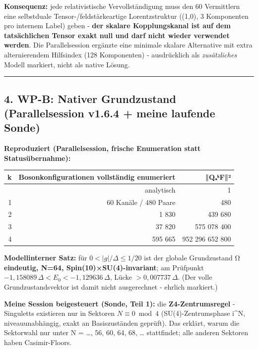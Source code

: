 \textbf{Konsequenz:} jede relativistische Vervollständigung muss den 60
Vermittlern eine selbstduale Tensor-/feldstärkeartige Lorentzstruktur
((1,0), 3 Komponenten pro internem Label) geben - \textbf{der skalare
Kopplungskanal ist auf dem tatsächlichen Tensor exakt null und darf
nicht wieder verwendet werden}. Die Parallelsession ergänzte eine
minimale skalare Alternative mit extra alternierendem Hilfsindex (128
Komponenten) - ausdrücklich als \emph{zusätzliches} Modell markiert,
nicht als native Lösung.

\begin{center}\rule{0.5\linewidth}{0.5pt}\end{center}

\subsection{4. WP-B: Nativer Grundzustand (Parallelsession v1.6.4 +
meine laufende
Sonde)}\label{wp-b-nativer-grundzustand-parallelsession-v1.6.4-meine-laufende-sonde}

\textbf{Reproduziert (Parallelsession, frische Enumeration statt
Statusübernahme):}

{\def\LTcaptype{none} %
\begin{longtable}[]{@{}rrr@{}}
\toprule\noalign{}
k & Bosonkonfigurationen vollständig enumeriert & ‖Q₊ᵏF‖² \\
\midrule\noalign{}
\endhead
\bottomrule\noalign{}
\endlastfoot
0 & analytisch & 1 \\
1 & 60 Kanäle / 480 Paare & 480 \\
2 & 1 830 & 439 680 \\
3 & 37 820 & 575 078 400 \\
4 & 595 665 & 952 296 652 800 \\
\end{longtable}
}

\textbf{Modellinterner Satz:} für \(0<|g|/\Delta\le 1/20\) ist der
globale Grundzustand Ω \textbf{eindeutig, N=64,
Spin(10)×SU(4)-invariant}; am Prüfpunkt
\(-1{,}158089\,\Delta < E_0 < -1{,}129636\,\Delta\), Lücke
\(> 0{,}007737\,\Delta\). (Der volle Grundzustandsvektor ist damit nicht
ausgerechnet - ehrlich markiert.)

\textbf{Meine Session beigesteuert (Sonde, Teil 1):} die
\textbf{Z4-Zentrumsregel} - Singuletts existieren nur in Sektoren
\(N\equiv 0 \bmod 4\) (SU(4)-Zentrumsphase i\^{}N, niveauunabhängig,
exakt an Basiszuständen geprüft). Das erklärt, warum die Sektorwahl nur
unter N = \ldots, 56, 60, 64, 68, \ldots{} stattfindet; alle anderen
Sektoren haben Casimir-Floors.


